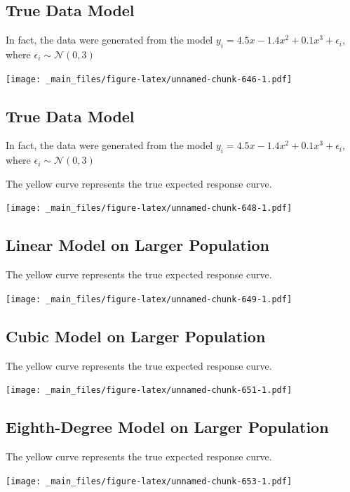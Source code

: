 \documentclass[]{book}
\begin{document}
\subsection{True Data Model}\label{true-data-model}

In fact, the data were generated from the model
\(y_i = 4.5x - 1.4x^2 + 0.1x^3 + \epsilon_i\), where
\(\epsilon_i\sim\mathcal{N}(0,3)\)

\texttt{[image: \_main\_files/figure-latex/unnamed-chunk-646-1.pdf]}

\subsection{True Data Model}\label{true-data-model-1}

In fact, the data were generated from the model
\(y_i = 4.5x - 1.4x^2 + 0.1x^3 + \epsilon_i\), where
\(\epsilon_i\sim\mathcal{N}(0,3)\)

The yellow curve represents the true expected response curve.

\texttt{[image: \_main\_files/figure-latex/unnamed-chunk-648-1.pdf]}

\subsection{Linear Model on Larger
Population}\label{linear-model-on-larger-population}

The yellow curve represents the true expected response curve.

\texttt{[image: \_main\_files/figure-latex/unnamed-chunk-649-1.pdf]}

\subsection{Cubic Model on Larger
Population}\label{cubic-model-on-larger-population}

The yellow curve represents the true expected response curve.

\texttt{[image: \_main\_files/figure-latex/unnamed-chunk-651-1.pdf]}

\subsection{Eighth-Degree Model on Larger
Population}\label{eighth-degree-model-on-larger-population}

The yellow curve represents the true expected response curve.

\texttt{[image: \_main\_files/figure-latex/unnamed-chunk-653-1.pdf]}
\end{document}
